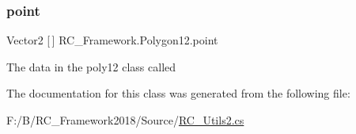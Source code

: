 \mbox{\label{class_r_c___framework_1_1_polygon12_a4579622849fdf2d01c9f40b54dfe3f04}} 
\subsubsection{\texorpdfstring{point}{point}}
{\footnotesize\ttfamily Vector2 \mbox{[}$\,$\mbox{]} R\+C\+\_\+\+Framework.\+Polygon12.\+point}



The data in the poly12 class called 



The documentation for this class was generated from the following file\+:\begin{DoxyCompactItemize}
\item 
F\+:/\+B/\+R\+C\+\_\+\+Framework2018/\+Source/\mbox{\hyperlink{_r_c___utils2_8cs}{R\+C\+\_\+\+Utils2.\+cs}}\end{DoxyCompactItemize}

